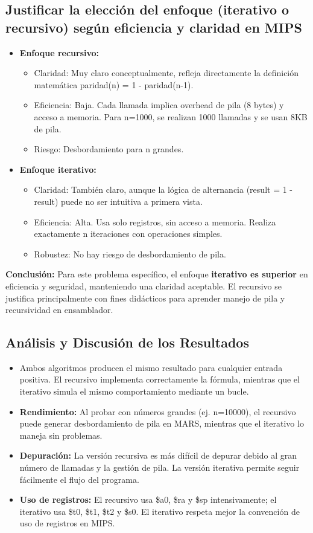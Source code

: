 \documentclass[12pt]{article}
\begin{document}
	\subsection{Justificar la elección del enfoque (iterativo o recursivo) según eficiencia y claridad en MIPS}
	\begin{itemize}
		\item \textbf{Enfoque recursivo:}
		\begin{itemize}
			\item Claridad: Muy claro conceptualmente, refleja directamente la definición matemática paridad(n) = 1 - paridad(n-1).
			\item Eficiencia: Baja. Cada llamada implica overhead de pila (8 bytes) y acceso a memoria. Para n=1000, se realizan 1000 llamadas y se usan 8KB de pila.
			\item Riesgo: Desbordamiento para n grandes.
		\end{itemize}
		\item \textbf{Enfoque iterativo:}
		\begin{itemize}
			\item Claridad: También claro, aunque la lógica de alternancia (result = 1 - result) puede no ser intuitiva a primera vista.
			\item Eficiencia: Alta. Usa solo registros, sin acceso a memoria. Realiza exactamente n iteraciones con operaciones simples.
			\item Robustez: No hay riesgo de desbordamiento de pila.
		\end{itemize}
	\end{itemize}
	
	\textbf{Conclusión:} Para este problema específico, el enfoque \textbf{iterativo es superior} en eficiencia y seguridad, manteniendo una claridad aceptable. El recursivo se justifica principalmente con fines didácticos para aprender manejo de pila y recursividad en ensamblador.
	
	\subsection{Análisis y Discusión de los Resultados}
	\begin{itemize}
		\item Ambos algoritmos producen el mismo resultado para cualquier entrada positiva. El recursivo implementa correctamente la fórmula, mientras que el iterativo simula el mismo comportamiento mediante un bucle.
		\item \textbf{Rendimiento:} Al probar con números grandes (ej. n=10000), el recursivo puede generar desbordamiento de pila en MARS, mientras que el iterativo lo maneja sin problemas.
		\item \textbf{Depuración:} La versión recursiva es más difícil de depurar debido al gran número de llamadas y la gestión de pila. La versión iterativa permite seguir fácilmente el flujo del programa.
		\item \textbf{Uso de registros:} El recursivo usa \$a0, \$ra y \$sp intensivamente; el iterativo usa \$t0, \$t1, \$t2 y \$s0. El iterativo respeta mejor la convención de uso de registros en MIPS.
	\end{itemize}
	
\end{document}
